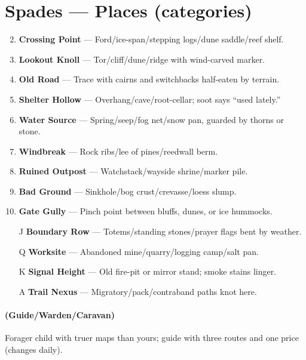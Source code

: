 \section*{Spades --- Places (categories)}
\label{sec:wilderness-places}
\begin{enumerate}
\setcounter{enumi}{1}
\item \textbf{Crossing Point} --- Ford/ice-span/stepping logs/dune saddle/reef shelf.
\item \textbf{Lookout Knoll} --- Tor/cliff/dune/ridge with wind-carved marker.
\item \textbf{Old Road} --- Trace with cairns and switchbacks half-eaten by terrain.
\item \textbf{Shelter Hollow} --- Overhang/cave/root-cellar; soot says ``used lately.''
\item \textbf{Water Source} --- Spring/seep/fog net/snow pan, guarded by thorns or stone.
\item \textbf{Windbreak} --- Rock ribs/lee of pines/reedwall berm.
\item \textbf{Ruined Outpost} --- Watchstack/wayside shrine/marker pile.
\item \textbf{Bad Ground} --- Sinkhole/bog crust/crevasse/loess slump.
\item \textbf{Gate Gully} --- Pinch point between bluffs, dunes, or ice hummocks.
\item[J] \textbf{Boundary Row} --- Totems/standing stones/prayer flags bent by weather.
\item[Q] \textbf{Worksite} --- Abandoned mine/quarry/logging camp/salt pan.
\item[K] \textbf{Signal Height} --- Old fire-pit or mirror stand; smoke stains linger.
\item[A] \textbf{Trail Nexus} --- Migratory/pack/contraband paths knot here.
\end{enumerate}

\paragraph*{(Guide/Warden/Caravan)} Forager child with truer maps than yours; guide with three routes and one price (changes daily).

